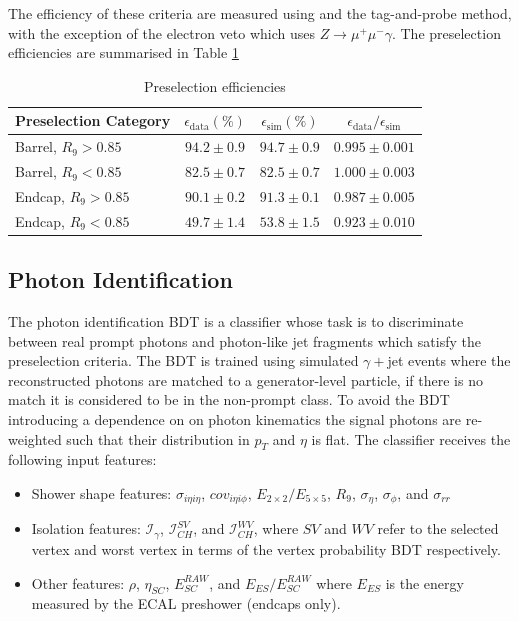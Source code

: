 The efficiency of these criteria are measured using \Zee and the tag-and-probe method, 
with the exception of the electron veto which uses $Z\rightarrow{}\mu^{+}\mu^{-}\gamma$. The preselection efficiencies are summarised in Table \ref{tab:object_reco:presel_eff}
\begin{table}[h!]
    \begin{tabular}{ l | c | c | c }
        Preselection Category& $\epsilon_{\mathrm{data}} (\%)$ & $\epsilon_{\mathrm{sim}} (\%)$ & $\epsilon_{\mathrm{data}}/\epsilon_{\mathrm{sim}}$ \\
        \hline
        Barrel, $R_{9}>0.85$ & $94.2\pm0.9$ & $94.7\pm0.9$ & $0.995\pm0.001$ \\
        Barrel, $R_{9}<0.85$ & $82.5\pm0.7$ & $82.5\pm0.7$ & $1.000\pm0.003$ \\ 
        \hline
        Endcap, $R_{9}>0.85$ & $90.1\pm0.2$ & $91.3\pm0.1$ & $0.987\pm0.005$ \\ 
        Endcap, $R_{9}<0.85$ & $49.7\pm1.4$ & $53.8\pm1.5$ & $0.923\pm0.010$ \\ 
\end{tabular}
    \caption{Preselection efficiencies}
    \label{tab:object_reco:presel_eff}
\end{table}





\subsection{Photon Identification}
The photon identification BDT is a classifier whose task is to discriminate between real prompt photons and photon-like jet fragments which satisfy the preselection criteria. 
The BDT is trained using simulated $\gamma + $jet events where the reconstructed photons are matched to a generator-level particle, if there is no match it is considered to be in the non-prompt class.
To avoid the BDT introducing a dependence on on photon kinematics the signal photons are re-weighted such that their distribution in $p_{T}$ and $\eta$ is flat. 
The classifier receives the following input features:
\begin{itemize}[leftmargin=.5in,noitemsep]
    \item Shower shape features: $\sigma_{i\eta{}i\eta}$, $cov_{i\eta{}i\phi}$, $E_{2\times{}2}/E_{5\times{}5}$, $R_{9}$, $\sigma_{\eta}$, $\sigma_{\phi}$, and $\sigma_{rr}$
    \item Isolation features: $\mathcal{I}_{\gamma}$, $\mathcal{I}_{CH}^{SV}$, and $\mathcal{I}_{CH}^{WV}$, where $SV$ and $WV$ refer to the selected vertex and worst vertex in terms of the vertex probability BDT respectively. 
    \item Other features: $\rho$, $\eta_{SC}$, $E_{SC}^{RAW}$, and $E_{ES}/E_{SC}^{RAW}$ where $E_{ES}$ is the energy measured by the ECAL preshower (endcaps only).
\end{itemize}

